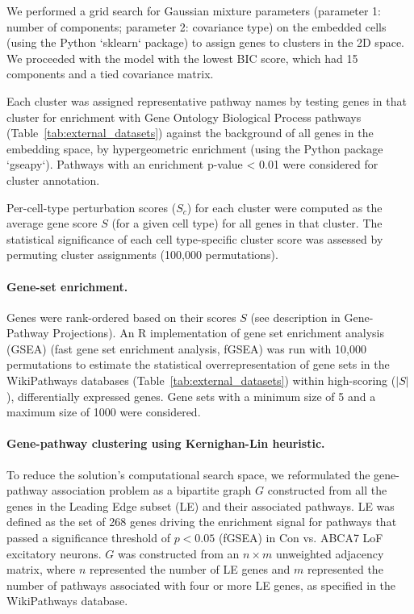 \documentclass[12pt]{article}
\begin{document}
We performed a grid search for Gaussian mixture parameters (parameter 1: number of components; parameter 2: covariance type) on the embedded cells (using the Python `sklearn` package) to assign genes to clusters in the 2D space. We proceeded with the model with the lowest BIC score, which had 15 components and a tied covariance matrix.

Each cluster was assigned representative pathway names by testing genes in that cluster for enrichment with Gene Ontology Biological Process pathways (Table~\ref{tab:external_datasets}) against the background of all genes in the embedding space, by hypergeometric enrichment (using the Python package `gseapy`). Pathways with an enrichment p-value < 0.01 were considered for cluster annotation.

Per-cell-type perturbation scores ($S_c$) for each cluster were computed as the average gene score $S$ (for a given cell type) for all genes in that cluster. The statistical significance of each cell type-specific cluster score was assessed by permuting cluster assignments (100,000 permutations).

\paragraph{Gene-set enrichment.}
Genes were rank-ordered based on their scores $S$ (see description in Gene-Pathway Projections). An R implementation of gene set enrichment analysis (GSEA) \cite{Subramanian2005-gt} (fast gene set enrichment analysis, fGSEA) was run with 10,000 permutations to estimate the statistical overrepresentation of gene sets in the WikiPathways databases (Table~\ref{tab:external_datasets}) within high-scoring ($|S|$), differentially expressed genes. Gene sets with a minimum size of 5 and a maximum size of 1000 were considered.

\paragraph{Gene-pathway clustering using Kernighan-Lin heuristic.}
To reduce the solution's computational search space, we reformulated the gene-pathway association problem as a bipartite graph $G$ constructed from all the genes in the Leading Edge subset (LE) and their associated pathways. LE was defined as the set of 268 genes driving the enrichment signal for pathways that passed a significance threshold of $p < 0.05$ (fGSEA) in Con vs. ABCA7 LoF excitatory neurons. $G$ was constructed from an $n \times m$ unweighted adjacency matrix, where $n$ represented the number of LE genes and $m$ represented the number of pathways associated with four or more LE genes, as specified in the WikiPathways database.
\end{document}
